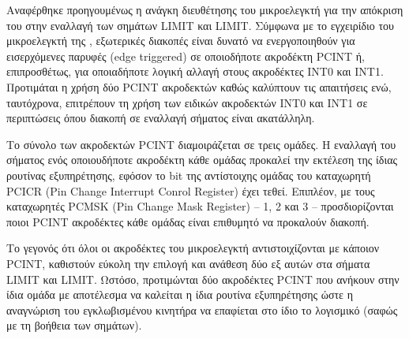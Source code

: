 Αναφέρθηκε προηγουμένως η ανάγκη διευθέτησης του μικροελεγκτή για την απόκριση
του στην εναλλαγή των σημάτων LIMIT και LIMIT. Σύμφωνα με το
εγχειρίδιο του μικροελεγκτή της \textcite[71]{atmel13}, εξωτερικές διακοπές
είναι δυνατό να ενεργοποιηθούν για εισερχόμενες παρυφές (\textenglish{edge
triggered}) σε οποιοδήποτε ακροδέκτη PCINT ή, επιπροσθέτως, για οποιαδήποτε
λογική αλλαγή στους ακροδέκτες INT0 και INT1. Προτιμάται η χρήση δύο PCINT
ακροδεκτών καθώς καλύπτουν τις απαιτήσεις ενώ, ταυτόχρονα, επιτρέπουν τη χρήση
των ειδικών ακροδεκτών INT0 και INT1 σε περιπτώσεις όπου διακοπή σε εναλλαγή
σήματος είναι ακατάλληλη.

Το σύνολο των ακροδεκτών PCINT διαμοιράζεται σε τρεις ομάδες. Η εναλλαγή του
σήματος ενός οποιουδήποτε ακροδέκτη κάθε ομάδας προκαλεί την εκτέλεση της ίδιας
ρουτίνας εξυπηρέτησης, εφόσον το bit της αντίστοιχης ομάδας του καταχωρητή PCICR
(\textenglish{Pin Change Interrupt Conrol Register}) έχει τεθεί. Επιπλέον, με
τους καταχωρητές PCMSK (\textenglish{Pin Change Mask Register}) -- 1, 2 και 3 --
προσδιορίζονται ποιοι PCINT ακροδέκτες κάθε ομάδας είναι επιθυμητό να προκαλούν
διακοπή.

Το γεγονός ότι όλοι οι ακροδέκτες του μικροελεγκτή αντιστοιχίζονται με κάποιον
PCINT, καθιστούν εύκολη την επιλογή και ανάθεση δύο εξ αυτών στα σήματα
LIMIT και LIMIT. Ωστόσο, προτιμώνται δύο ακροδέκτες PCINT που
ανήκουν στην ίδια ομάδα με αποτέλεσμα να καλείται η ίδια ρουτίνα εξυπηρέτησης
ώστε η αναγνώριση του εγκλωβισμένου κινητήρα να επαφίεται στο ίδιο το λογισμικό
(σαφώς με τη βοήθεια των σημάτων).

